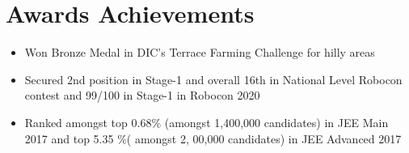 \documentclass[a4paper,11pt]{article}
\begin{document}
\section{Awards Achievements}
\begin{minipage}[t]{\linewidth}
    \begin{itemize}[nosep,after=\strut, leftmargin=1em, itemsep=3pt]
        \item Won Bronze Medal in DIC’s Terrace Farming Challenge for hilly areas
        \item Secured 2nd position in Stage-1 and overall 16th in National Level Robocon contest and 99/100 in Stage-1 in Robocon 2020
        \item  Ranked amongst top 0.68\% (amongst 1,400,000 candidates) in JEE Main 2017 and top 5.35 \%( amongst 2, 00,000 candidates) in JEE Advanced 2017
    \end{itemize}
\end{minipage}


\begin{refsection}
\nocite{*}
\end{refsection}



\vfill
{}
\end{document}
